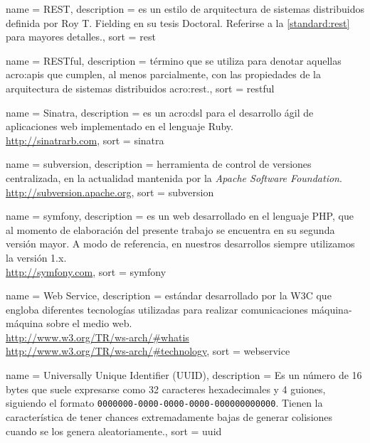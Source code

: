  {
  name = {REST},
  description = {es un estilo de arquitectura de sistemas distribuidos definida por Roy T. Fielding en su tesis Doctoral. Referirse a la \autoref{standard:rest} para mayores detalles.},
  sort = {rest}
}

 {
  name = {RESTful},
  description = {término que se utiliza para denotar aquellas \glspl{acro:api} que cumplen, al menos parcialmente, con las propiedades de la arquitectura de sistemas distribuidos \gls{acro:rest}.},
  sort = {restful}
}

 {
  name = {Sinatra},
  description = {es un \gls{acro:dsl} para el desarrollo ágil de aplicaciones web implementado en el lenguaje Ruby.\\\url{http://sinatrarb.com}},
  sort = {sinatra}
}

 {
  name = {subversion},
  description = {herramienta de control de versiones centralizada, en la actualidad mantenida por la \textit{Apache Software Foundation}.\\\url{http://subversion.apache.org}},
  sort = {subversion}
}

 {
  name = {symfony},
  description = {es un  web desarrollado en el lenguaje PHP, que al momento de elaboración del presente trabajo se encuentra en su segunda versión mayor. A modo de referencia, en nuestros desarrollos siempre utilizamos la versión 1.x.\\\url{http://symfony.com}},
  sort = {symfony}
}

 {
  name = {Web Service},
  description = {estándar desarrollado por la W3C que engloba diferentes tecnologías utilizadas para realizar comunicaciones máquina-máquina sobre el medio web.\\\url{http://www.w3.org/TR/ws-arch/\#whatis}\\\url{http://www.w3.org/TR/ws-arch/\#technology}},
  sort = {webservice}
}

 {
  name = {Universally Unique Identifier (UUID)},
  description = {Es un número de 16 bytes que suele expresarse como 32 caracteres hexadecimales y 4 guiones, siguiendo el formato \texttt{0000000-0000-0000-0000-000000000000}. Tienen la característica de tener chances extremadamente bajas de generar colisiones cuando se los genera aleatoriamente.},
  sort = {uuid}
}

